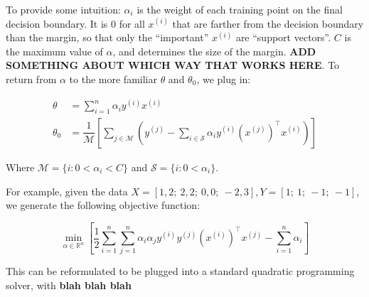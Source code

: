 \documentclass[10pt,letterpaper]{article}
\begin{document}
To provide some intuition: $\alpha_i$ is the weight of each training point on the final decision boundary. It is 0 for all $x^{(i)}$ that are farther from the decision boundary than the margin, so that only the ``important'' $x^{(i)}$ are ``support vectors''. $C$ is the maximum value of $\alpha$, and determines the size of the margin. \textbf{ADD SOMETHING ABOUT WHICH WAY THAT WORKS HERE}. To return from $\alpha$ to the more familiar $\theta$ and $\theta_0$, we plug in:

\begin{align}
\theta &= \sum_{i=1}^n \alpha_i y^{(i)} x^{(i)} \\
\theta_0 &= \dfrac{1}{\mathcal{M}} \left[ \sum_{j \in \mathcal{M}} \left( y^{(j)} - \sum_{i \in \mathcal{S}} \alpha_i y^{(i)} (x^{(j)})^\intercal x^{(i)} \right) \right]
\end{align}

Where $\mathcal{M} = \{ i : 0 < \alpha_i < C \}$ and $\mathcal{S} = \{ i : 0 < \alpha_i \}$.

For example, given the data $X = [1, 2;\ 2, 2;\ 0, 0;\ -2, 3], Y = [1;\ 1;\ -1;\ -1]$, we generate the following objective function:

\begin{equation}
\min_{\alpha \in \mathbb{R}^n} \left[\dfrac{1}{2} \sum_{i=1}^n \sum_{j=1}^n \alpha_i \alpha_j y^{(i)} y^{(j)} (x^{(i)})^\intercal x^{(j)} - \sum_{i=1}^n \alpha_i \right]
\end{equation}

This can be reformulated to be plugged into a standard quadratic programming solver, with \textbf{blah blah blah}
\end{document}
